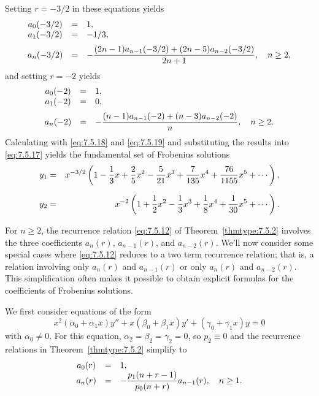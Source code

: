 \begin{examplesolution}
Setting $r=-3/2$ in these equations yields
\begin{equation}
  \label{eq:7.5.18}
  \begin{array}{ccl}
    a_{0}(-3/2) & = & 1,                                                                      \\
    a_{1}(-3/2) & = & -1/3,                                                                   \\[2\jot]
    a_{n}(-3/2) & = & -\displaystyle\frac{(2n-1)a_{n-1}(-3/2)+ (2n-5)a_{n-2}(-3/2)}{2n+1},\quad n\ge2,
  \end{array}
\end{equation}
and setting $r=-2$ yields
\begin{equation}
  \label{eq:7.5.19}
  \begin{array}{ccl}
    a_{0}(-2) & = & 1,                                                            \\
    a_{1}(-2) & = & 0,                                                            \\[2\jot]
    a_{n}(-2) & = & -\displaystyle\frac{(n-1)a_{n-1}(-2)+(n-3)a_{n-2}(-2)}{n},\quad n\ge2.
  \end{array}
\end{equation}
Calculating with \eqref{eq:7.5.18} and \eqref{eq:7.5.19} and substituting the results into
\eqref{eq:7.5.17} yields the fundamental set of Frobenius solutions
\begin{eqnarray*}
  y_{1} & = & x^{-3/2}\left(1-\frac{1}{3}x+\frac{2}{5}x^{2}-\frac{5}{21}x^{3}+\frac{7}{135}x^{4}+\frac{76}{1155}x^{5}+\cdots\right), \\[2\jot]
  y_{2} & = & x^{-2}\left(1+\frac{1}{2}x^{2}-\frac{1}{3}x^{3}+\frac{1}{8}x^{4}+\frac{1}{30}x^{5}+\cdots\right).
\end{eqnarray*}
\end{examplesolution}


\noindent
For $n\ge2$, the recurrence relation \eqref{eq:7.5.12} of Theorem~\ref{thmtype:7.5.2} involves the
three coefficients $a_{n}(r)$, $a_{n-1}(r)$, and $a_{n-2}(r)$. We'll now consider some special cases
where \eqref{eq:7.5.12} reduces to a two term recurrence relation; that is, a relation involving
only $a_{n}(r)$ and $a_{n-1}(r)$ or only $a_{n}(r)$ and $a_{n-2}(r)$. This simplification often
makes it possible to obtain explicit formulas for the coefficients of Frobenius solutions.

We first consider equations of the form
\[
  x^{2}(\alpha_{0}+\alpha_{1}x)y''+x(\beta_{0}+\beta_{1}x)y'+(\gamma_{0}+\gamma_{1}x)y=0
\]
with $\alpha_{0}\ne0$. For this equation, $\alpha_{2}=\beta_{2}=\gamma_{2}=0$, so $p_{2}\equiv0$ and
the recurrence relations in Theorem~\ref{thmtype:7.5.2} simplify to
\begin{equation}
  \label{eq:7.5.20}
  \begin{array}{ccl}
    a_{0}(r) & = & 1,                                                          \\
    a_{n}(r) & = & -\displaystyle\frac{p_{1}(n+r-1)}{p_{0}(n+r)}a_{n-1}(r),\quad n\ge1.
  \end{array}
\end{equation}


